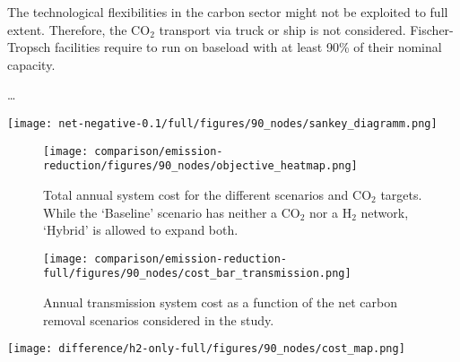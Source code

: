 \documentclass[twocolumn]{article}
\newcommand{\carbon}{CO$_2$}
\newcommand{\hydrogen}{H$_2$}
\newcommand{\hydrogengrid}{\hydrogen{}--Grid}
\begin{document}
The technological flexibilities in the carbon sector might not be exploited to full extent. Therefore, the \carbon{} transport via truck or ship is not considered. Fischer-Tropsch facilities require to run on baseload with at least 90\% of their nominal capacity.

\dots





\printbibliography

\appendix


\begin{figure*}
    \centering
    \texttt{[image: net-negative-0.1/full/figures/90\_nodes/sankey\_diagramm.png]}
    \caption{Sankey diagram of the optimal operation for a net-negative 10\% scenario.}
    \label{fig:sankey_diagramm}
\end{figure*}

\begin{figure}
    \centering
    \texttt{[image: comparison/emission-reduction/figures/90\_nodes/objective\_heatmap.png]}
    \caption{Total annual system cost for the different scenarios and \carbon{} targets. While the `Baseline' scenario has neither a \carbon{} nor a \hydrogen{} network, `Hybrid' is allowed to expand both.}
    \label{fig:objective_heatmap}
\end{figure}


\begin{figure}[ht]
    \centering
    \texttt{[image: comparison/emission-reduction-full/figures/90\_nodes/cost\_bar\_transmission.png]}
    \caption{Annual transmission system cost as a function of the net carbon removal scenarios considered in the study.}
    \label{fig:cost_bar_transmission}
\end{figure}


\begin{figure*}[ht]
    \centering
    \texttt{[image: difference/h2-only-full/figures/90\_nodes/cost\_map.png]}
    \caption{Difference in cost investments between \hydrogengrid{} and Hybrid model. The left subfigure shows higher spendings per technology and region and transport system for the \hydrogengrid{} model, the right shows higher spendings in the Hydrid model.}
    \label{fig:cost_map_difference}
\end{figure*}
\end{document}
